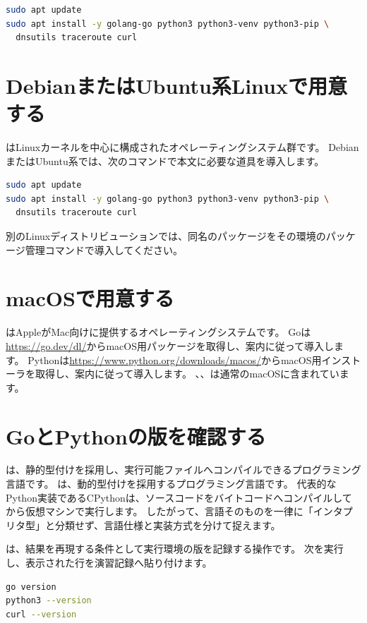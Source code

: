 \begin{lstlisting}[language=bash]
sudo apt update
sudo apt install -y golang-go python3 python3-venv python3-pip \
  dnsutils traceroute curl
\end{lstlisting}

\section{DebianまたはUbuntu系Linuxで用意する}

はLinuxカーネルを中心に構成されたオペレーティングシステム群です。
DebianまたはUbuntu系では、次のコマンドで本文に必要な道具を導入します。

\begin{lstlisting}[language=bash]
sudo apt update
sudo apt install -y golang-go python3 python3-venv python3-pip \
  dnsutils traceroute curl
\end{lstlisting}

別のLinuxディストリビューションでは、同名のパッケージをその環境のパッケージ管理コマンドで導入してください。

\section{macOSで用意する}

はAppleがMac向けに提供するオペレーティングシステムです。
Goは\url{https://go.dev/dl/}からmacOS用パッケージを取得し、案内に従って導入します。
Pythonは\url{https://www.python.org/downloads/macos/}からmacOS用インストーラを取得し、案内に従って導入します。
\code{dig}、\code{traceroute}、\code{curl}は通常のmacOSに含まれています。

\section{GoとPythonの版を確認する}

は、静的型付けを採用し、実行可能ファイルへコンパイルできるプログラミング言語です。
は、動的型付けを採用するプログラミング言語です。
代表的なPython実装であるCPythonは、ソースコードをバイトコードへコンパイルしてから仮想マシンで実行します。
したがって、言語そのものを一律に「インタプリタ型」と分類せず、言語仕様と実装方式を分けて捉えます。

は、結果を再現する条件として実行環境の版を記録する操作です。
次を実行し、表示された行を演習記録へ貼り付けます。

\begin{lstlisting}[language=bash]
go version
python3 --version
curl --version
\end{lstlisting}

